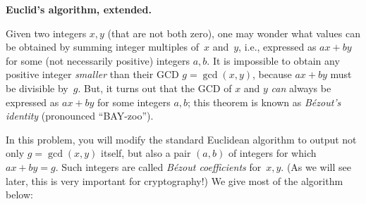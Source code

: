 \documentclass[11pt,addpoints,answers]{exam}
\begin{document}
\begin{questions}

    
  \question \textbf{Euclid's algorithm, extended.}
  
  Given two integers $x,y$ (that are not both zero), one may wonder what values can be obtained by summing integer multiples of~$x$ and~$y$, i.e., expressed as $ax+by$ for some (not necessarily positive) integers $a,b$.
  It is impossible to obtain any positive integer \emph{smaller} than their GCD $g = \gcd(x,y)$, because $ax+by$ must be divisible by~$g$.
  But, it turns out that the GCD of $x$ and $y$ \emph{can} always be expressed as $ax+by$ for some integers $a,b$; this theorem is known as \emph{B\'{e}zout's identity} (pronounced ``BAY-zoo'').
    
  In this problem, you will modify the standard Euclidean algorithm to output not only $g=\gcd(x,y)$ itself, but also a pair $(a,b)$ of integers for which $ax+by = g$.
  Such integers are called \emph{B\'{e}zout coefficients} for~$x,y$.   (As we will see later, this is very important for cryptography!)
  We give most of the algorithm below:
    

\end{questions}
\end{document}
